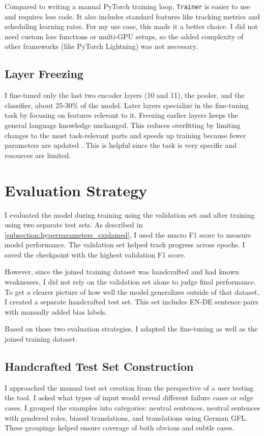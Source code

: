     Compared to writing a manual PyTorch training loop, \texttt{Trainer} is easier to use and requires less code. It also includes standard features like tracking metrics and scheduling learning rates. For my use case, this made it a better choice. I did not need custom loss functions or multi-GPU setups, so the added complexity of other frameworks (like PyTorch Lightning) was not necessary.

    \subsection{Layer Freezing}
    I fine-tuned only the last two encoder layers (10 and 11), the pooler, and the classifier, about 25-30\% of the model. Later layers specialize in the fine-tuning task by focusing on features relevant to it. Freezing earlier layers keeps the general language knowledge unchanged. This reduces overfitting by limiting changes to the most task-relevant parts and speeds up training because fewer parameters are updated \parencite{nadipalliLayerWiseEvolutionRepresentations2025}. This is helpful since the task is very specific and resources are limited.

\section{Evaluation Strategy}
    I evaluated the model during training using the validation set and after training using two separate test sets. As described in \autoref{subsection:hyperparameters_explained}, I used the macro F1 score to measure model performance. The validation set helped track progress across epochs. I saved the checkpoint with the highest validation F1 score.

    However, since the joined training dataset was handcrafted and had known weaknesses, I did not rely on the validation set alone to judge final performance. To get a clearer picture of how well the model generalizes outside of that dataset, I created a separate handcrafted test set. This set includes EN-DE sentence pairs with manually added bias labels.
    
    Based on those two evaluation strategies, I adapted the fine-tuning as well as the joined training dataset. 

\subsection{Handcrafted Test Set Construction} \label{subsection:eval_dataset}
    I approached the manual test set creation from the perspective of a user testing the tool. I asked what types of input would reveal different failure cases or edge cases. I grouped the examples into categories: neutral sentences, neutral sentences with gendered roles, biased translations, and translations using German GFL. These groupings helped ensure coverage of both obvious and subtle cases.


